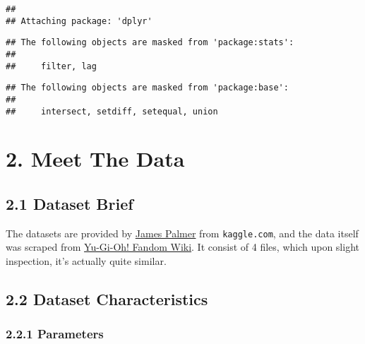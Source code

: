 \documentclass[
]{article}
\begin{document}
\begin{verbatim}
## 
## Attaching package: 'dplyr'
\end{verbatim}

\begin{verbatim}
## The following objects are masked from 'package:stats':
## 
##     filter, lag
\end{verbatim}

\begin{verbatim}
## The following objects are masked from 'package:base':
## 
##     intersect, setdiff, setequal, union
\end{verbatim}

\hypertarget{meet-the-data}{%
\section{2. Meet The Data}\label{meet-the-data}}

\hypertarget{dataset-brief}{%
\subsection{2.1 Dataset Brief}\label{dataset-brief}}

The datasets are provided by
\href{https://www.kaggle.com/jpalmer2}{James Palmer} from
\texttt{kaggle.com}, and the data itself was scraped from
\href{https://yugioh.fandom.com/wiki/Yu-Gi-Oh!}{Yu-Gi-Oh! Fandom Wiki}.
It consist of 4 files, which upon slight inspection, it's actually quite
similar.

\hypertarget{dataset-characteristics}{%
\subsection{2.2 Dataset Characteristics}\label{dataset-characteristics}}

\hypertarget{parameters}{%
\subsubsection{2.2.1 Parameters}\label{parameters}}
\end{document}
